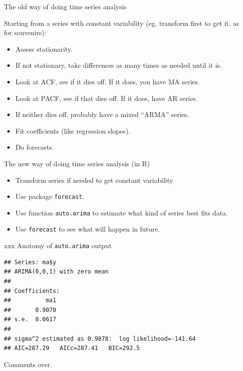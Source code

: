\documentclass[ignorenonframetext,]{beamer}
\newenvironment{Shaded}{\begin{snugshade}}{\end{snugshade}}
\newcommand{\KeywordTok}[1]{\textcolor[rgb]{0.13,0.29,0.53}{\textbf{#1}}}
\newcommand{\NormalTok}[1]{#1}
\newcommand{\OperatorTok}[1]{\textcolor[rgb]{0.81,0.36,0.00}{\textbf{#1}}}
\providecommand{\tightlist}{%
  \setlength{\itemsep}{0pt}\setlength{\parskip}{0pt}}
\begin{document}
\begin{frame}{The old way of doing time series analysis}
\protect\hypertarget{the-old-way-of-doing-time-series-analysis}{}

Starting from a series with constant variability (eg. transform first to
get it, as for souvenirs):

\begin{itemize}
\tightlist
\item
  Assess stationarity.
\item
  If not stationary, take differences as many times as needed until it
  is.
\item
  Look at ACF, see if it dies off. If it does, you have MA series.
\item
  Look at PACF, see if that dies off. If it does, have AR series.
\item
  If neither dies off, probably have a mixed ``ARMA'' series.
\item
  Fit coefficients (like regression slopes).
\item
  Do forecasts.
\end{itemize}

\end{frame}

\begin{frame}[fragile]{The new way of doing time series analysis (in R)}
\protect\hypertarget{the-new-way-of-doing-time-series-analysis-in-r}{}

\begin{itemize}
\tightlist
\item
  Transform series if needed to get constant variability
\item
  Use package \texttt{forecast}.
\item
  Use function \texttt{auto.arima} to estimate what kind of series best
  fits data.
\item
  Use \texttt{forecast} to see what will happen in future.
\end{itemize}

\end{frame}

\begin{frame}[fragile]{xxx Anatomy of \texttt{auto.arima} output}
\protect\hypertarget{xxx-anatomy-of-auto.arima-output}{}

\begin{Shaded}
\end{Shaded}

\begin{verbatim}
## Series: ma$y 
## ARIMA(0,0,1) with zero mean 
## 
## Coefficients:
##          ma1
##       0.9070
## s.e.  0.0617
## 
## sigma^2 estimated as 0.9878:  log likelihood=-141.64
## AIC=287.29   AICc=287.41   BIC=292.5
\end{verbatim}

Comments over.

\end{frame}
\end{document}
